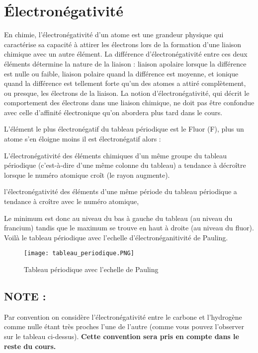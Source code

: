 \documentclass[a4paper, oneside]{book}
\begin{document}
\section{\'Electronégativité}
En chimie, l'électronégativité d'un atome est une grandeur physique qui caractérise sa capacité à attirer les électrons lors de la formation d'une liaison chimique avec un autre élément. La différence d'électronégativité entre ces deux éléments détermine la nature de la liaison : liaison apolaire lorsque la différence est nulle ou faible, liaison polaire quand la différence est moyenne, et ionique quand la différence est tellement forte qu'un des atomes a attiré complètement, ou presque, les électrons de la liaison. La notion d'électronégativité, qui décrit le comportement des électrons dans une liaison chimique, ne doit pas être confondue avec celle d'affinité électronique qu'on abordera plus tard dans le cours.

L'élément le plus électronégatif du tableau périodique est le Fluor (F), plus un atome s'en éloigne moins il est électronégatif alors : 
\begin{description}
    \item L'électronégativité des éléments chimiques d'un même groupe du tableau périodique (c'est-à-dire d'une même colonne du tableau) a tendance à décroître lorsque le numéro atomique croît (le rayon augmente).  
    \item l'électronégativité des éléments d'une même période du tableau périodique a tendance à croître avec le numéro atomique,
\end{description}

Le minimum est donc au niveau du bas à gauche du tableau (au niveau du francium) tandis que le maximum se trouve en haut à droite (au niveau du fluor). Voilà le tableau périodique avec l'echelle d'électronéganitivité de Pauling.
\begin{figure}[!h]
    \centering
    \texttt{[image: tableau\_periodique.PNG]}
    \caption{Tableau périodique avec l'echelle de Pauling}
    \label{fig:my_label}
\end{figure}
\subsection*{NOTE :}
Par convention on considère l'électronégativité entre le carbone et l'hydrogène comme nulle étant très proches l'une de l'autre (comme vous pouvez l'observer sur le tableau ci-dessus). \textbf{Cette convention sera pris en compte dans le reste du cours.}
\end{document}
